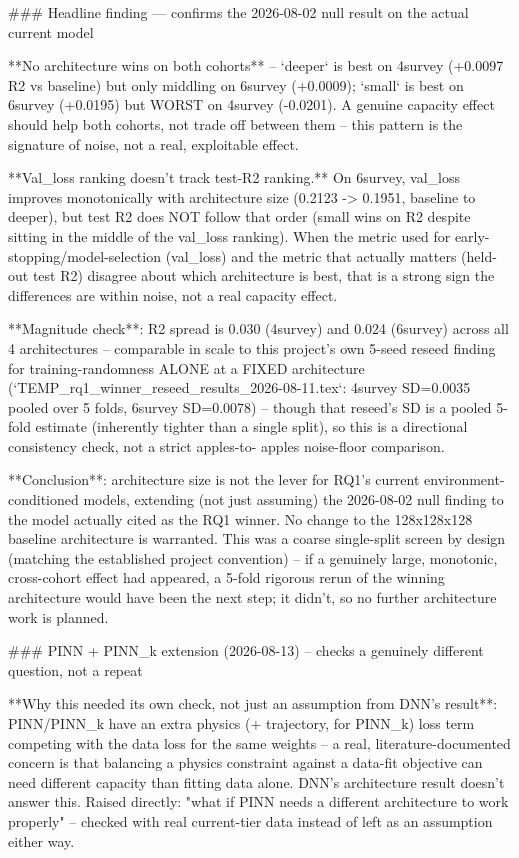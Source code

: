 ### Headline finding — confirms the 2026-08-02 null result on the actual current model

**No architecture wins on both cohorts** -- `deeper` is best on 4survey (+0.0097 R2 vs baseline)
but only middling on 6survey (+0.0009); `small` is best on 6survey (+0.0195) but WORST on 4survey
(-0.0201). A genuine capacity effect should help both cohorts, not trade off between them -- this
pattern is the signature of noise, not a real, exploitable effect.

**Val_loss ranking doesn't track test-R2 ranking.** On 6survey, val_loss improves monotonically
with architecture size (0.2123 -> 0.1951, baseline to deeper), but test R2 does NOT follow that
order (small wins on R2 despite sitting in the middle of the val_loss ranking). When the metric
used for early-stopping/model-selection (val_loss) and the metric that actually matters (held-out
test R2) disagree about which architecture is best, that is a strong sign the differences are
within noise, not a real capacity effect.

**Magnitude check**: R2 spread is 0.030 (4survey) and 0.024 (6survey) across all 4 architectures --
comparable in scale to this project's own 5-seed reseed finding for training-randomness ALONE at a
FIXED architecture (`TEMP_rq1_winner_reseed_results_2026-08-11.tex`: 4survey SD=0.0035 pooled over
5 folds, 6survey SD=0.0078) -- though that reseed's SD is a pooled 5-fold estimate (inherently
tighter than a single split), so this is a directional consistency check, not a strict apples-to-
apples noise-floor comparison.

**Conclusion**: architecture size is not the lever for RQ1's current environment-conditioned
models, extending (not just assuming) the 2026-08-02 null finding to the model actually cited as
the RQ1 winner. No change to the 128x128x128 baseline architecture is warranted. This was a coarse
single-split screen by design (matching the established project convention) -- if a genuinely
large, monotonic, cross-cohort effect had appeared, a 5-fold rigorous rerun of the winning
architecture would have been the next step; it didn't, so no further architecture work is planned.

### PINN + PINN_k extension (2026-08-13) -- checks a genuinely different question, not a repeat

**Why this needed its own check, not just an assumption from DNN's result**: PINN/PINN_k have an
extra physics (+ trajectory, for PINN_k) loss term competing with the data loss for the same
weights -- a real, literature-documented concern is that balancing a physics constraint against a
data-fit objective can need different capacity than fitting data alone. DNN's architecture result
doesn't answer this. Raised directly: "what if PINN needs a different architecture to work
properly" -- checked with real current-tier data instead of left as an assumption either way.

